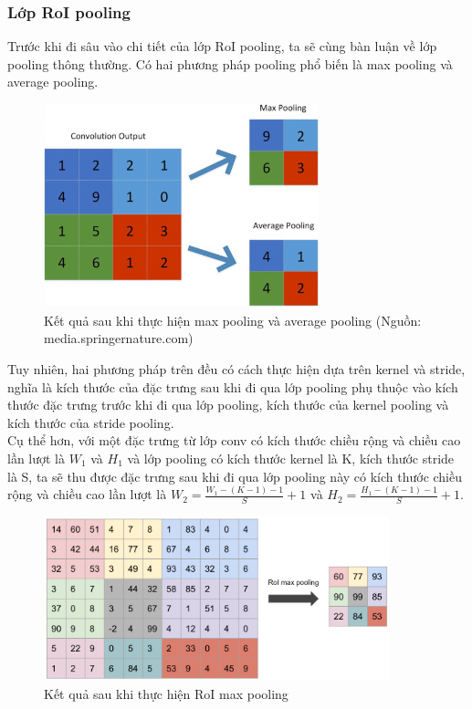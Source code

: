 {    \subsubsection*{Lớp RoI pooling}
    Trước khi đi sâu vào chi tiết của lớp RoI pooling, ta sẽ cùng bàn luận về lớp pooling thông thường.
    Có hai phương pháp pooling phổ biến là max pooling và average pooling.

    \begin{figure}[H]
        \centering
        \includegraphics[width=8cm] {images/pooling}
        \caption{Kết quả sau khi thực hiện max pooling và average pooling (Nguồn: media.springernature.com)}
        \label{fig:pooling}
    \end{figure}

    \noindent
    Tuy nhiên, hai phương pháp trên đều có cách thực hiện dựa trên kernel và stride, nghĩa là kích thước của đặc trưng sau khi đi qua lớp pooling phụ thuộc vào kích thước đặc trưng trước khi đi qua lớp pooling, kích thước của kernel pooling và kích thước của stride pooling. \\
    Cụ thể hơn, với một đặc trưng từ lớp conv có kích thước chiều rộng và chiều cao lần lượt là ${W}_{1}$ và ${H}_{1}$ và lớp pooling có kích thước kernel là K, kích thước stride là S, ta sẽ thu được đặc trưng sau khi đi qua lớp pooling này có kích thước chiều rộng và chiều cao lần lượt là ${W}_{2} = \frac{{W}_{1} - (K - 1) - 1}{S} + 1$ và ${H}_{2} = \frac{{H}_{1} - (K - 1) - 1}{S} + 1$.

    \begin{figure}[H]
        \centering
        \includegraphics[width=10cm] {images/roi_pooling}
        \caption{Kết quả sau khi thực hiện RoI max pooling}
        \label{fig:roi_pooling}
    \end{figure}

}

